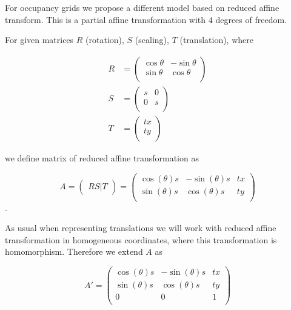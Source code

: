 For occupancy grids we propose a different model based on reduced affine transform. This is a partial affine transformation with $4$ degrees of freedom.

\begin{defn}
For given matrices $R$ (rotation), $S$ (scaling), $T$ (translation), where

\begin{align}
    R &=
    \begin{pmatrix}
        \cos{\theta} & -\sin{\theta} \\
        \sin{\theta} & \cos{\theta} \\
    \end{pmatrix} \\
    S &=
    \begin{pmatrix}
        s & 0 \\
        0 & s \\
    \end{pmatrix} \\
    T &=
    \begin{pmatrix}
        tx \\
        ty \\
    \end{pmatrix}
\end{align}

we define matrix of reduced affine transformation as

\begin{equation}
    A =
    \begin{pmatrix}
        RS|T
    \end{pmatrix}
    =
    \begin{pmatrix}
        \cos(\theta)s & -\sin(\theta)s & tx \\
        \sin(\theta)s & \cos(\theta)s & ty \\
    \end{pmatrix}
\end{equation}.
\end{defn}

As usual when representing translations we will work with reduced affine transformation in homogeneous coordinates, where this transformation is homomorphism. Therefore we extend $A$ as

\begin{equation}
    A' =
    \begin{pmatrix}
        \cos(\theta)s & -\sin(\theta)s & tx \\
        \sin(\theta)s & \cos(\theta)s & ty \\
        0 & 0 & 1 \\
    \end{pmatrix}
\end{equation}

